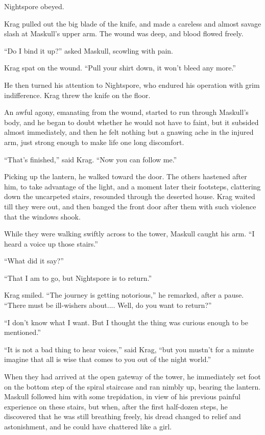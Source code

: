 Nightspore obeyed.

Krag pulled out the big blade of the knife, and made a careless and almost savage slash at Maskull's upper arm. The wound was deep, and blood flowed freely.

``Do I bind it up?'' asked Maskull, scowling with pain.

Krag spat on the wound. ``Pull your shirt down, it won't bleed any more.''

He then turned his attention to Nightspore, who endured his operation with grim indifference. Krag threw the knife on the floor.

An awful agony, emanating from the wound, started to run through Maskull's body, and he began to doubt whether he would not have to faint, but it subsided almost immediately, and then he felt nothing but a gnawing ache in the injured arm, just strong enough to make life one long discomfort.

``That's finished,'' said Krag. ``Now you can follow me.''

Picking up the lantern, he walked toward the door. The others hastened after him, to take advantage of the light, and a moment later their footsteps, clattering down the uncarpeted stairs, resounded through the deserted house. Krag waited till they were out, and then banged the front door after them with such violence that the windows shook.

While they were walking swiftly across to the tower, Maskull caught his arm. ``I heard a voice up those stairs.''

``What did it say?''

``That I am to go, but Nightspore is to return.''

Krag smiled. ``The journey is getting notorious,'' he remarked, after a pause. ``There must be ill-wishers about.... Well, do you want to return?''

``I don't know what I want. But I thought the thing was curious enough to be mentioned.''

``It is not a bad thing to hear voices,'' said Krag, ``but you mustn't for a minute imagine that all is wise that comes to you out of the night world.''

When they had arrived at the open gateway of the tower, he immediately set foot on the bottom step of the spiral staircase and ran nimbly up, bearing the lantern. Maskull followed him with some trepidation, in view of his previous painful experience on these stairs, but when, after the first half-dozen steps, he discovered that he was still breathing freely, his dread changed to relief and astonishment, and he could have chattered like a girl.

